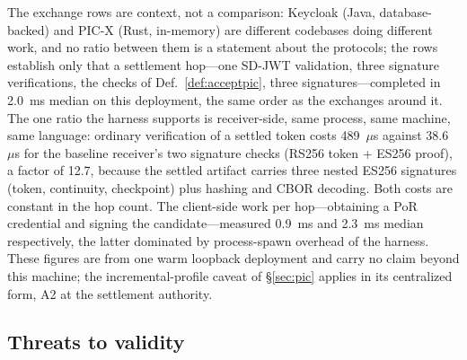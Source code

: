 \documentclass[conference]{IEEEtran}
\begin{document}
The exchange rows are context, not a comparison: Keycloak (Java, database-backed) and PIC-X (Rust, in-memory) are different codebases doing different work, and no ratio between them is a statement about the protocols; the rows establish only that a settlement hop---one SD-JWT validation, three signature verifications, the checks of Def.~\ref{def:acceptpic}, three signatures---completed in 2.0~ms median on this deployment, the same order as the exchanges around it. The one ratio the harness supports is receiver-side, same process, same machine, same language: ordinary verification of a settled token costs 489~$\mu$s against 38.6~$\mu$s for the baseline receiver's two signature checks (RS256 token + ES256 proof), a factor of 12.7, because the settled artifact carries three nested ES256 signatures (token, continuity, checkpoint) plus hashing and CBOR decoding. Both costs are constant in the hop count. The client-side work per hop---obtaining a PoR credential and signing the candidate---measured 0.9~ms and 2.3~ms median respectively, the latter dominated by process-spawn overhead of the harness. These figures are from one warm loopback deployment and carry no claim beyond this machine; the incremental-profile caveat of \S\ref{sec:pic} applies in its centralized form, A2 at the settlement authority.

\subsection{Threats to validity}
\end{document}
